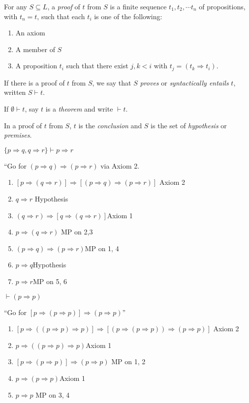 \documentclass[a4paper]{article}
\begin{document}
\begin{defi}
  For any $S\subseteq L$, a \emph{proof} of $t$ from $S$ is a finite sequence $t_1, t_2, \cdots t_n$ of propositions, with $t_n = t$, such that each $t_i$ is one of the following:
\begin{enumerate}
  \item An axiom
  \item A member of $S$
  \item A proposition $t_i$ such that there exist $j, k < i$ with $t_j = (t_k\Rightarrow t_i)$.
\end{enumerate}
If there is a proof of $t$ from $S$, we say that $S$ \emph{proves} or \emph{syntactically entails} $t$, written $S\vdash t$.

If $\emptyset \vdash t$, say $t$ is a \emph{theorem} and write $\vdash t$.

In a proof of $t$ from $S$, $t$ is the \emph{conclusion} and $S$ is the set of \emph{hypothesis} or \emph{premises}.


\end{defi}
\begin{eg}
  $\{p\Rightarrow q, q\Rightarrow r\} \vdash p\Rightarrow r$

  ``Go for $(p\Rightarrow  q)\Rightarrow  (p\Rightarrow  r)$ via Axiom 2.
  \begin{enumerate}[label=\arabic{*}.]
    \item $[p\Rightarrow (q\Rightarrow r)]\Rightarrow [(p\Rightarrow q) \Rightarrow (p\Rightarrow r)]$ \hfill Axiom 2
    \item $q\Rightarrow r$ \hfill Hypothesis
    \item $(q\Rightarrow r)\Rightarrow [q\Rightarrow (q\Rightarrow r)]$\hfill Axiom 1
    \item $p\Rightarrow (q\Rightarrow r)$ \hfill MP on 2,3
    \item $(p\Rightarrow q)\Rightarrow (p\Rightarrow r)$\hfill MP on 1, 4
    \item $p\Rightarrow q$\hfill Hypothesis
    \item $p\Rightarrow r$\hfill MP on 5, 6
  \end{enumerate}
\end{eg}

\begin{eg}
  $\vdash (p\Rightarrow p)$

  ``Go for $[p\Rightarrow (p\Rightarrow p)]\Rightarrow (p\Rightarrow p)$''
  \begin{enumerate}[label=\arabic{*}.]
    \item $[p\Rightarrow ((p\Rightarrow p)\Rightarrow p)]\Rightarrow [(p\Rightarrow (p\Rightarrow p))\Rightarrow (p\Rightarrow p)]$ \hfill Axiom 2
    \item $p\Rightarrow ( (p\Rightarrow p)\Rightarrow p)$\hfill Axiom 1
    \item $[p\Rightarrow (p\Rightarrow p)]\Rightarrow (p\Rightarrow p)$ \hfill MP on 1, 2
    \item $p\Rightarrow (p\Rightarrow p)$\hfill Axiom 1
    \item $p\Rightarrow p$ \hfill MP on 3, 4
  \end{enumerate}
\end{eg}
\end{document}
